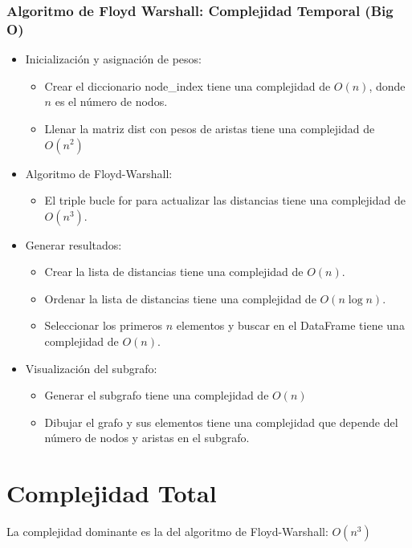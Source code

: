 \documentclass[12pt]{article}
\begin{document}
\subsubsection{Algoritmo de Floyd Warshall: Complejidad Temporal (Big O)}
\begin{itemize}
    \item Inicialización y asignación de pesos:
    \begin{itemize}
        \item Crear el diccionario node\_index tiene una complejidad de $O(n)$, donde $n$ es el número de nodos.
        \item Llenar la matriz dist con pesos de aristas tiene una complejidad de $O(n^2)$
    \end{itemize}
    \item Algoritmo de Floyd-Warshall:
    \begin{itemize}
        \item El triple bucle for para actualizar las distancias tiene una complejidad de $O(n^3)$.
    \end{itemize}
    \item Generar resultados:
    \begin{itemize}
        \item Crear la lista de distancias tiene una complejidad de $O(n)$.
        \item Ordenar la lista de distancias tiene una complejidad de $O(n\log n)$.
        \item Seleccionar los primeros $n$ elementos y buscar en el DataFrame tiene una complejidad de $O(n)$.
    \end{itemize}
    \item Visualización del subgrafo:
    \begin{itemize}
        \item Generar el subgrafo tiene una complejidad de $O(n)$
        \item Dibujar el grafo y sus elementos tiene una complejidad que depende del número de nodos y aristas en el subgrafo.
    \end{itemize}
\end{itemize}

\section{Complejidad Total}
La complejidad dominante es la del algoritmo de Floyd-Warshall: $O(n^3)$
\end{document}
